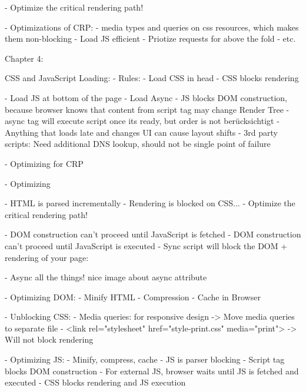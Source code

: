 - Optimize the critical rendering path!


- Optimizations of CRP:
- media types and queries on css resources, which makes them non-blocking
- Load JS efficient
- Priotize requests for above the fold
- etc. %

Chapter 4:

CSS and JavaScript Loading:
- Rules:
- Load CSS in head
- CSS blocks rendering

- Load JS at bottom of the page
- Load Async
- JS blocks DOM construction, because browser knows that content from script tag may change Render Tree
- async tag will execute script once its ready, but order is not berücksichtigt
- Anything that loads late and changes UI can cause layout shifts
- 3rd party scripts: Need additional DNS lookup, should not be single point of failure


- Optimizing for CRP


- Optimizing


-  HTML is parsed incrementally
- Rendering is blocked on CSS...
- Optimize the critical rendering path!

- DOM construction can't proceed until JavaScript is fetched
- DOM construction can't proceed until JavaScript is executed
- Sync script will block the DOM + rendering of your page:

- Async all the things! nice image about async attribute


- Optimizing DOM:
	- Minify HTML
	- Compression
	- Cache in Browser


- Unblocking CSS:
	- Media queries: for responsive design
	-> Move media queries to separate file
	- <link rel="stylesheet" href="style-print.css" media="print">
	-> Will not block rendering


- Optimizing JS:
	- Minify, compress, cache
	- JS is parser blocking
	- Script tag blocks DOM construction
	- For external JS, browser waits until JS is fetched and executed
	- CSS blocks rendering and JS execution

